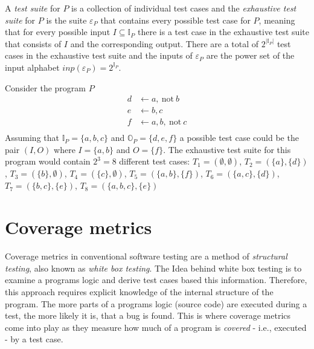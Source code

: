 A \emph{test suite} for $P$ is a collection of individual test cases and the \emph{exhaustive test suite} for $P$ is the suite \(\varepsilon_P\) that contains every possible test case for $P$, meaning that for every possible input \(I \subseteq \mathbb{I}_P\) there is a test case in the exhaustive test suite that consists of $I$ and the corresponding output. There are a total of \(2^{|\mathbb{I}_P|}\) test cases in the exhaustive test suite and the inputs of $\varepsilon_P$ are the power set of the input alphabet \(inp(\varepsilon_P) = 2^{\mathbb{I}_P}\).

\begin{example}
\label{ex:test suite}
    Consider the program $P$
    \begin{align*}
        d &\leftarrow a,\ \text{not}\ b \\
        e &\leftarrow b, c \\
        f &\leftarrow a, b,\ \text{not}\ c \\
    \end{align*}
    Assuming that \(\mathbb{I}_P = \{a, b, c\}\) and \(\mathbb{O}_P = \{d, e, f\}\) a possible test case could be the pair \((I, O)\) where \(I = \{a, b\}\) and \(O = \{f\}\).
    The exhaustive test suite for this program would contain \(2^3 = 8\) different test cases: \(T_1 = (\emptyset, \emptyset)\), \(T_2 = (\{a\}, \{d\})\), \(T_3 
 = (\{b\}, \emptyset)\), \(T_4 = (\{c\}, \emptyset)\), \(T_5 = (\{a, b\}, \{f\})\), \(T_6 = (\{a, c\}, \{d\})\), \(T_7 = (\{b, c\}, \{e\})\), \(T_8 = (\{a, b, c\}, \{e\})\)
\end{example}

\chapter{Coverage metrics}
\label{ch:Coverage metrics}
Coverage metrics in conventional software testing are a method of \emph{structural testing}, also known as \emph{white box testing}. The Idea behind white box testing is to examine a programs logic and derive test cases based this information. Therefore, this approach requires explicit knowledge of the internal structure of the program. The more parts of a programs logic (source code) are executed during a test, the more likely it is, that a bug is found. This is where coverage metrics come into play as they measure how much of a program is \emph{covered} - i.e., executed - by a test case.

